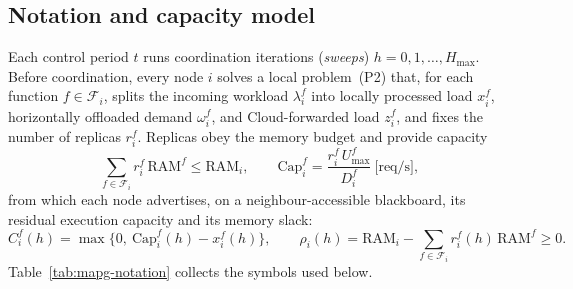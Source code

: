 \subsection{Notation and capacity model}
\label{sec:mapg-notation}

Each control period $t$ runs coordination iterations (\emph{sweeps})
$h=0,1,\dots,H_{\max}$. Before coordination, every node $i$ solves a local
problem~(P2) that, for each function $f\in\mathcal{F}_i$, splits the incoming
workload $\lambda_i^f$ into locally processed load $x_i^f$, horizontally
offloaded demand $\omega_i^f$, and Cloud-forwarded load $z_i^f$, and fixes the
number of replicas $r_i^f$. Replicas obey the memory budget and provide
capacity
\begin{equation}
  \sum_{f\in\mathcal{F}_i} r_i^f\,\mathrm{RAM}^f \le \mathrm{RAM}_i,
  \qquad
  \mathrm{Cap}_i^f = \frac{r_i^f\,U^f_{\max}}{D_i^f}\ \text{[req/s]} ,
  \tag{1,2}
\end{equation}
from which each node advertises, on a neighbour-accessible blackboard, its
residual execution capacity and its memory slack:
\begin{equation}
  C_i^f(h) = \max\!\big\{0,\ \mathrm{Cap}_i^f(h) - x_i^f(h)\big\},
  \qquad
  \rho_i(h) = \mathrm{RAM}_i - \sum_{f\in\mathcal{F}_i} r_i^f(h)\,\mathrm{RAM}^f \ge 0 .
  \tag{12,13}
\end{equation}
Table~\ref{tab:mapg-notation} collects the symbols used below.

